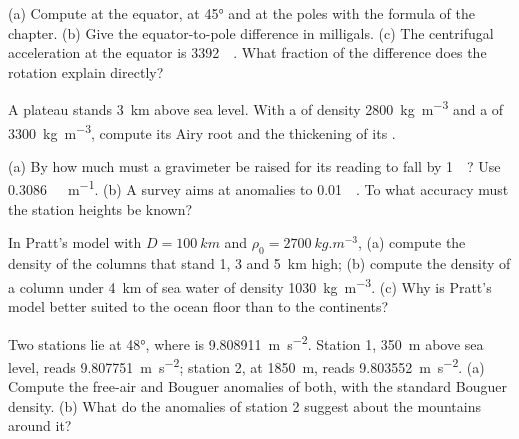 \begin{exercise}[$\star$]\label{exo:b1:isostasy-gravity:2}
(a) Compute  at the equator, at \ang{45} and at the poles with
the formula of the chapter. (b) Give the equator-to-pole difference in
milligals. (c) The centrifugal acceleration at the equator is
\qty{3392}{\milli\gal}. What fraction of the difference does the rotation
explain directly?
\end{exercise}

\begin{exercise}[$\star$]\label{exo:b1:isostasy-gravity:3}
A plateau stands \qty{3}{km} above sea level. With a  of density
\qty{2800}{kg.m^{-3}} and a  of \qty{3300}{kg.m^{-3}}, compute its Airy root
and the thickening of its .
\end{exercise}

\begin{exercise}[$\star$]\label{exo:b1:isostasy-gravity:4}
(a) By how much must a gravimeter be raised for its reading to fall by
\qty{1}{\milli\gal}? Use \qty{0.3086}{\milli\gal.m^{-1}}. (b) A survey aims at
anomalies to \qty{0.01}{\milli\gal}. To what accuracy must the station heights
be known?
\end{exercise}

\begin{exercise}[$\star\star$]\label{exo:b1:isostasy-gravity:5}
In Pratt's model with $D = \qty{100}{km}$ and $\rho_0 = \qty{2700}{kg.m^{-3}}$,
(a) compute the density of the columns that stand 1, 3 and \qty{5}{km} high;
(b) compute the density of a column under \qty{4}{km} of sea water of density
\qty{1030}{kg.m^{-3}}. (c) Why is Pratt's model better suited to the ocean
floor than to the continents?
\end{exercise}

\begin{exercise}[$\star\star$]\label{exo:b1:isostasy-gravity:6}
Two stations lie at  \ang{48}, where  is
\qty{9.808911}{m.s^{-2}}. Station 1, \qty{350}{m} above sea level, reads
\qty{9.807751}{m.s^{-2}}; station 2, at \qty{1850}{m}, reads
\qty{9.803552}{m.s^{-2}}. (a) Compute the free-air and Bouguer anomalies of
both, with the standard Bouguer density. (b) What do the anomalies of station 2
suggest about the mountains around it?
\end{exercise}

